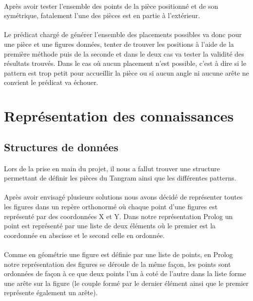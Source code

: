 \documentclass{report}
\begin{document}
    \paragraph{} Après avoir tester l'ensemble des points de la pièce positionné et de son
    symétrique, fatalement l'une des pièces est en partie à l'extérieur.

    \paragraph{} Le prédicat chargé de générer l'ensemble des placements possibles va donc pour une
    pièce et une figures données, tenter de trouver les positions à l'aide de la première méthode
    puis de la seconde et dans le deux cas va tester la validité des résultats trouvés.  Dans le cas
    où aucun placement n'est possible, c'est à dire si le pattern est trop petit pour accueillir la
    pièce ou si aucun angle ni aucune arête ne convient le prédicat va échouer.

\newpage
\section{Représentation des connaissances}
    \subsection{Structures de données}

        \paragraph{}Lors de la prise en main du projet, il nous a fallut trouver une structure
        permettant de définir les pièces du Tangram ainsi que les différentes patterns. 
        
        \paragraph{}Après avoir envisagé plusieurs solutions nous avons décidé de représenter toutes
        les figures dans un repère orthonormé où chaque point d'une figures est représenté par des
        coordonnées X et Y.  Dans notre représentation Prolog un point est représenté par une liste
        de deux éléments où le premier est la coordonnée en abscisse et le second celle en ordonnée.

        \paragraph{}Comme en géométrie une figure est définie par une liste de points, en Prolog
        notre représentation des figures se déroule de la même façon, les points sont ordonnées de
        façon à ce que deux points l'un à coté de l'autre dans la liste forme une arête sur la
        figure (le couple formé par le dernier élément ainsi que le premier représente également un
        arête).
\end{document}
